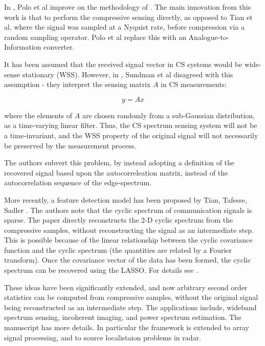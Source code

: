 In \cite{polo2009compressive}, Polo et al improve on the methodology of \cite{Tian2007}. The main innovation from this work is that to perform the compressive sensing directly, as opposed to Tian et al, where the signal was sampled at a Nyquist rate, before compression via a random sampling operator. Polo et al replace this with an Analogue-to-Information converter. 

It has been assumed that the received signal vector in CS systems would be wide-sense stationary (WSS). However, in \cite{sundman2010use}, Sundman et al disagreed with this assumption - they interpret the sensing matrix \(A\) in CS measurements:

\begin{equation}
y = Ax
\end{equation}

where the elements of \(A\) are chosen randomly from a sub-Gaussian distribution, as a time-varying linear filter. Thus, the CS spectrum sensing system will not be a time-invariant, and the WSS property of the original signal will not necessarily be preserved by the measurement process.

The authors subvert this problem, by instead adopting a definition of the recovered signal based upon the autocorreleation matrix, instead of the autocorrelation sequence of the edge-spectrum.

More recently, a feature detection model has been proposed by Tian, Tafesse, Sadler \cite{tian2012cyclic}. The authors note that the cyclic spectrum of communication signals is sparse. The paper directly reconstructs the 2-D cyclic spectrum from the compressive samples, without reconstructing the signal as an intermediate step. This is possible because of the linear relationship between the cyclic covariance function and the cyclic spectrum (the quantities are related by a Fourier transform). Once the covariance vector of the data has been formed, the cyclic spectrum can be recovered using the LASSO. For details see \cite{tian2012cyclic}.

These ideas have been significantly extended, and now arbitrary second order statistics can be computed from compressive samples, without the original signal being reconstructed as an intermediate step. The applications include, wideband spectrum sensing, incoherent imaging, and power spectrum estimation. The manuscript \cite{romero2016compressive} has more details. In particular the framework is extended to array signal processing, and to source localistaion problems in radar.

